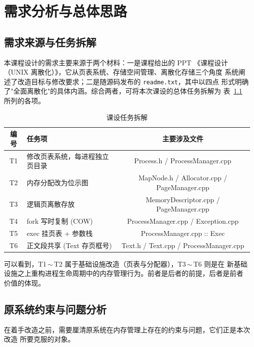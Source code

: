 \chapter{需求分析与总体思路}

\section{需求来源与任务拆解}
本课程设计的需求主要来源于两个材料：一是课程给出的 PPT
《课程设计（UNIX 离散化）》，它从页表系统、存储空间管理、离散化存储三个角度
系统阐述了改造目标与修改要求；二是随源码发布的 \texttt{readme.txt}，其中以四点
形式明确了"全面离散化"的具体内涵。综合两者，可将本次课设的总体任务拆解为
表~\ref{tab:task-breakdown} 所列的各项。

\begin{table}[H]
  \centering
  \caption{课设任务拆解}
  \label{tab:task-breakdown}
  \begin{tabular}{clc}
    \toprule
    编号 & 任务项 & 主要涉及文件 \\
    \midrule
    T1 & 修改页表系统，每进程独立页目录 & Process.h / ProcessManager.cpp \\
    T2 & 内存分配改为位示图            & MapNode.h / Allocator.cpp / PageManager.cpp \\
    T3 & 逻辑页离散存放                 & MemoryDescriptor.cpp / PageManager.cpp \\
    T4 & fork 写时复制 (COW)            & ProcessManager.cpp / Exception.cpp \\
    T5 & exec 挂页表 + 参数栈           & ProcessManager.cpp :: Exec \\
    T6 & 正文段共享 (Text 存页框号)     & Text.h / Text.cpp / ProcessManager.cpp \\
    \bottomrule
  \end{tabular}
\end{table}

可以看到，T1\,$\sim$\,T2 属于基础设施改造（页表与分配器），T3\,$\sim$\,T6 则是在
新基础设施之上重构进程生命周期中的内存管理行为。前者是后者的前提，后者是前者
价值的体现。

\section{原系统约束与问题分析}
在着手改造之前，需要厘清原系统在内存管理上存在的约束与问题，它们正是本次改造
所要克服的对象。

